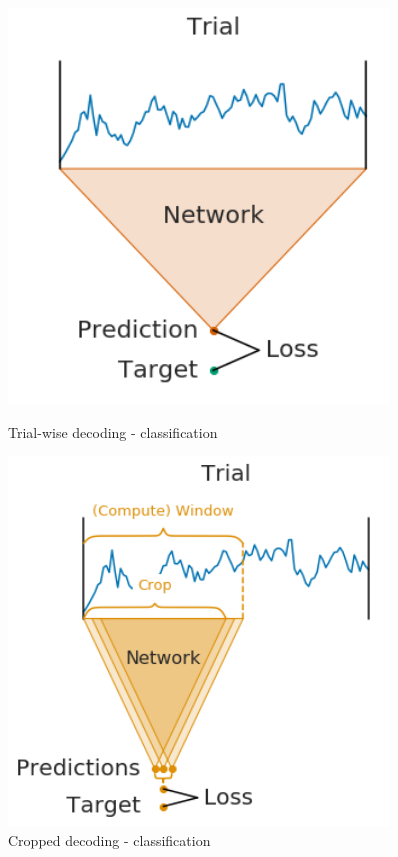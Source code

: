 \begin{figure}[!htbp]
    \centering
    \RawFloats
    \begin{minipage}{0.4\textwidth}
        \centering
        \includegraphics[width=0.9\textwidth]{img/ch3/trialwise-explanation}
        \caption{Trial-wise decoding - classification}
    \end{minipage}\hfill
    \begin{minipage}{0.5\textwidth}
        \centering
        \includegraphics[width=0.9\textwidth]{img/ch3/trialwise-explanation2} 
        \caption{Cropped decoding - classification}
    \end{minipage}
\end{figure}\label{fig:trial-wise-decoding}


